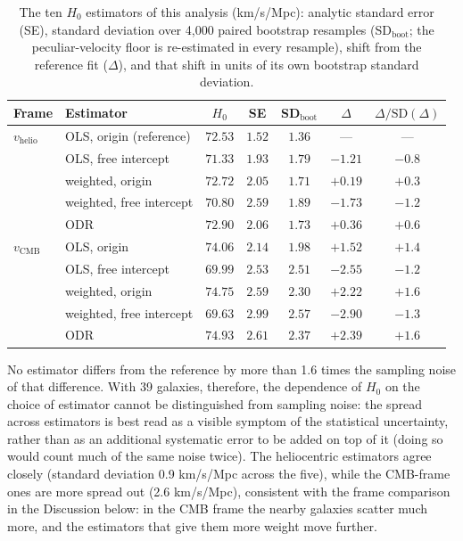 \documentclass[11pt]{article}
\begin{document}
\begin{table}[htbp]
\centering
\small
\begin{tabular}{llccccc}
\toprule
Frame & Estimator & $H_0$ & SE & SD$_{\text{boot}}$ & $\Delta$ & $\Delta/\text{SD}(\Delta)$ \\
\midrule
$v_{\text{helio}}$ & OLS, origin (reference) & $72.53$ & $1.52$ & $1.36$ & --- & --- \\
 & OLS, free intercept & $71.33$ & $1.93$ & $1.79$ & $-1.21$ & $-0.8$ \\
 & weighted, origin & $72.72$ & $2.05$ & $1.71$ & $+0.19$ & $+0.3$ \\
 & weighted, free intercept & $70.80$ & $2.59$ & $1.89$ & $-1.73$ & $-1.2$ \\
 & ODR & $72.90$ & $2.06$ & $1.73$ & $+0.36$ & $+0.6$ \\
\midrule
$v_{\text{CMB}}$ & OLS, origin & $74.06$ & $2.14$ & $1.98$ & $+1.52$ & $+1.4$ \\
 & OLS, free intercept & $69.99$ & $2.53$ & $2.51$ & $-2.55$ & $-1.2$ \\
 & weighted, origin & $74.75$ & $2.59$ & $2.30$ & $+2.22$ & $+1.6$ \\
 & weighted, free intercept & $69.63$ & $2.99$ & $2.57$ & $-2.90$ & $-1.3$ \\
 & ODR & $74.93$ & $2.61$ & $2.37$ & $+2.39$ & $+1.6$ \\
\bottomrule
\end{tabular}
\caption{The ten $H_0$ estimators of this analysis (km/s/Mpc): analytic standard error (SE), standard deviation over 4{,}000 paired bootstrap resamples (SD$_{\text{boot}}$; the peculiar-velocity floor is re-estimated in every resample), shift from the reference fit ($\Delta$), and that shift in units of its own bootstrap standard deviation.}
\label{tab:method_vs_noise}
\end{table}

No estimator differs from the reference by more than 1.6 times the sampling noise of that difference. With 39 galaxies, therefore, the dependence of $H_0$ on the choice of estimator cannot be distinguished from sampling noise: the spread across estimators is best read as a visible symptom of the statistical uncertainty, rather than as an additional systematic error to be added on top of it (doing so would count much of the same noise twice). The heliocentric estimators agree closely (standard deviation 0.9 km/s/Mpc across the five), while the CMB-frame ones are more spread out (2.6 km/s/Mpc), consistent with the frame comparison in the Discussion below: in the CMB frame the nearby galaxies scatter much more, and the estimators that give them more weight move further.
\end{document}
